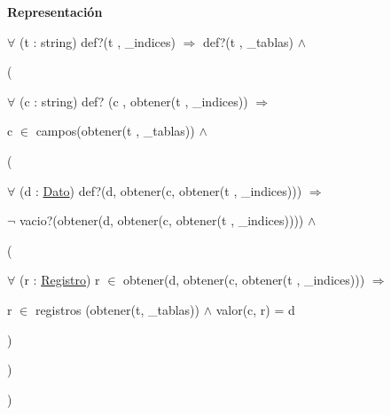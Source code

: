 \begin{Indent}{\bf Representación}
{$\forall$ (t \-: string) def?(t , \-\_\-indices) $\Rightarrow$ def?(t , \-\_\-tablas) $\land$
\begin{DoxyItemize}
\item (
\begin{DoxyItemize}
\item $\forall$ (c \-: string) def? (c , obtener(t , \-\_\-indices)) $\Rightarrow$
\begin{DoxyItemize}
\item c $\in$ campos(obtener(t , \-\_\-tablas)) $\land$
\item (
\begin{DoxyItemize}
\item $\forall$ (d \-: \hyperlink{classDato}{Dato}) def?(d, obtener(c, obtener(t , \-\_\-indices))) $\Rightarrow$
\begin{DoxyItemize}
\item $\lnot$ vacio?(obtener(d, obtener(c, obtener(t , \-\_\-indices)))) $\land$
\item (
\begin{DoxyItemize}
\item $\forall$ (r \-: \hyperlink{classRegistro}{Registro}) r $\in$ obtener(d, obtener(c, obtener(t , \-\_\-indices))) $\Rightarrow$
\begin{DoxyItemize}
\item r $\in$ registros (obtener(t, \-\_\-tablas)) $\land$ valor(c, r) = d
\end{DoxyItemize}
\end{DoxyItemize}
\item )
\end{DoxyItemize}
\end{DoxyItemize}
\item )
\end{DoxyItemize}
\end{DoxyItemize}
\item )
\end{DoxyItemize}

}
\end{Indent}

